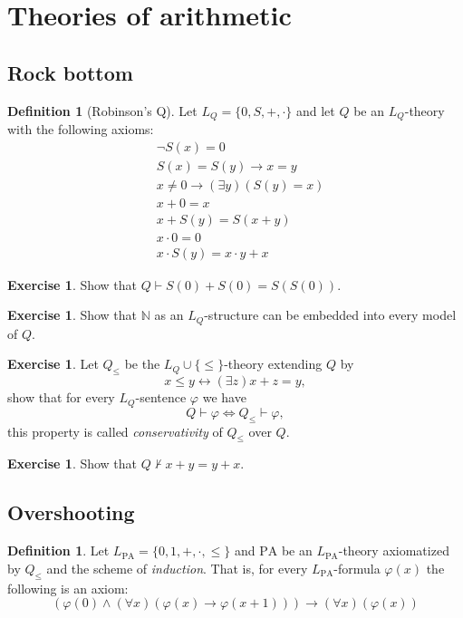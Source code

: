 \documentclass{article}
\theoremstyle{definition}
\newtheorem{excs}[thrm]{Exercise}
\newtheorem{defi}[thrm]{Definition}
\newcommand{\NN}{\mathbb{N}}
\newcommand{\PA}{\text{PA}}
\begin{document}
\section*{Theories of arithmetic}

\subsection*{Rock bottom}

\begin{defi}[Robinson's Q]
    Let $L_Q=\{0,S,+,\cdot\}$ and let $Q$ be an $L_Q$-theory with the following axioms:
    \begin{align}
        &\lnot S(x) = 0\\
        &S(x)=S(y) \to x=y\\
        &x\neq 0 \to (\exists y)(S(y)=x)\\
        &x+0 = x \\
        & x+S(y) = S(x+y)\\
        & x \cdot 0 = 0\\
        & x \cdot S(y) =x\cdot y + x 
    \end{align}
\end{defi}

\begin{excs}
    Show that $Q \vdash S(0) + S(0) = S(S(0)).$
\end{excs}

\begin{excs}
    Show that $\NN$ as an $L_Q$-structure can be embedded into every model of $Q$.
\end{excs}

\begin{excs}
    Let $Q_\leq$ be the $L_Q\cup\{\leq\}$-theory extending $Q$ by
    \[x \leq y \leftrightarrow (\exists z) x+z = y,\]
    show that for every $L_Q$-sentence $\varphi$ we have
    \[Q \vdash \varphi \iff Q_\leq \vdash \varphi,\]
    this property is called \emph{conservativity} of $Q_\leq$ over $Q$.
\end{excs}

\begin{excs}
    Show that $Q \nvdash x+y = y+x$.
\end{excs}
    
\subsection*{Overshooting}

\begin{defi}
    Let $L_\PA=\{0,1,+,\cdot, \leq \}$ and $\PA$ be an $L_\PA$-theory axiomatized by $Q_\leq$ and the scheme of \emph{induction}. That is, for every $L_\PA$-formula $\varphi(x)$ the following is an axiom:
    \[(\varphi(0) \land (\forall x)(\varphi(x)\to \varphi(x+1)))\to (\forall x)(\varphi(x))\]
\end{defi}
\end{document}
